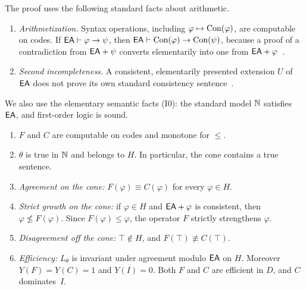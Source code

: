 The proof uses the following standard facts about arithmetic.
\begin{enumerate}
\item[(I1)] \emph{Arithmetization.} Syntax operations, including $\varphi\mapsto\mathrm{Con}(\varphi)$, are computable on codes. If $\mathsf{EA}\vdash\varphi\to\psi$, then $\mathsf{EA}\vdash\mathrm{Con}(\varphi)\to\mathrm{Con}(\psi)$, because a proof of a contradiction from $\mathsf{EA}+\psi$ converts elementarily into one from $\mathsf{EA}+\varphi$~\cite{ArtemovBeklemishev2005}.
\item[(I2)] \emph{Second incompleteness.} A consistent, elementarily presented extension $U$ of $\mathsf{EA}$ does not prove its own standard consistency sentence~\cite{ArtemovBeklemishev2005}.
\end{enumerate}
We also use the elementary semantic facts (I0): the standard model $\mathbb{N}$ satisfies $\mathsf{EA}$, and first-order logic is sound.

\begin{theorem}\label{thm:guarded}
\leavevmode
\begin{enumerate}
\item[\textup{(a)}] $F$ and $C$ are computable on codes and monotone for $\le$.
\item[\textup{(b)}] $\theta$ is true in $\mathbb{N}$ and belongs to $H$. In particular, the cone contains a true sentence.
\item[\textup{(c)}] \emph{Agreement on the cone:} $F(\varphi)\equiv C(\varphi)$ for every $\varphi\in H$.
\item[\textup{(d)}] \emph{Strict growth on the cone:} if $\varphi\in H$ and $\mathsf{EA}+\varphi$ is consistent, then $\varphi\not\le F(\varphi)$. Since $F(\varphi)\le\varphi$, the operator $F$ strictly strengthens $\varphi$.
\item[\textup{(e)}] \emph{Disagreement off the cone:} $\top\notin H$, and $F(\top)\not\equiv C(\top)$.
\item[\textup{(f)}] \emph{Efficiency:} $L_\theta$ is invariant under agreement modulo $\mathsf{EA}$ on $H$. Moreover $Y(F)=Y(C)=1$ and $Y(I)=0$. Both $F$ and $C$ are efficient in $D$, and $C$ dominates~$I$.
\end{enumerate}
\end{theorem}

